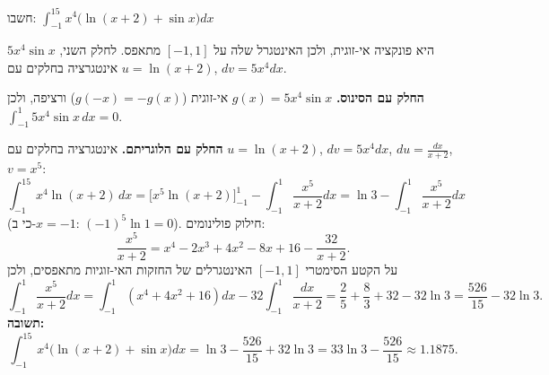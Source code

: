 
\begin{question}
חשבו: $\displaystyle\int_{-1}^15x^4\big(\ln(x+2)+\sin x\big)dx$
\end{question}

\begin{hint}
$5x^4\sin x$ היא פונקציה אי-זוגית, ולכן האינטגרל שלה על $[-1,1]$ מתאפס. לחלק השני, אינטגרציה בחלקים עם $u=\ln(x+2)$, $dv=5x^4dx$.
\end{hint}

\begin{solution}
\textbf{החלק עם הסינוס.} $g(x)=5x^4\sin x$ אי-זוגית ($g(-x)=-g(x)$) ורציפה, ולכן $\int_{-1}^1 5x^4\sin x\,dx=0$.

\textbf{החלק עם הלוגריתם.} אינטגרציה בחלקים עם $u=\ln(x+2)$, $dv=5x^4dx$, $du=\frac{dx}{x+2}$, $v=x^5$:
\[
\int_{-1}^15x^4\ln(x+2)\,dx=\Big[x^5\ln(x+2)\Big]_{-1}^1-\int_{-1}^1\frac{x^5}{x+2}dx=\ln3-\int_{-1}^1\frac{x^5}{x+2}dx
\]
(כי ב-$x=-1$: $(-1)^5\ln1=0$). חילוק פולינומים:
\[
\frac{x^5}{x+2}=x^4-2x^3+4x^2-8x+16-\frac{32}{x+2}.
\]
על הקטע הסימטרי $[-1,1]$ האינטגרלים של החזקות האי-זוגיות מתאפסים, ולכן
\[
\int_{-1}^1\frac{x^5}{x+2}dx=\int_{-1}^1\left(x^4+4x^2+16\right)dx-32\int_{-1}^1\frac{dx}{x+2}
=\frac25+\frac83+32-32\ln3=\frac{526}{15}-32\ln3.
\]
\textbf{תשובה:}
\[
\int_{-1}^15x^4\big(\ln(x+2)+\sin x\big)dx=\ln3-\frac{526}{15}+32\ln3=33\ln3-\frac{526}{15}\approx1.1875.
\]
\end{solution}
